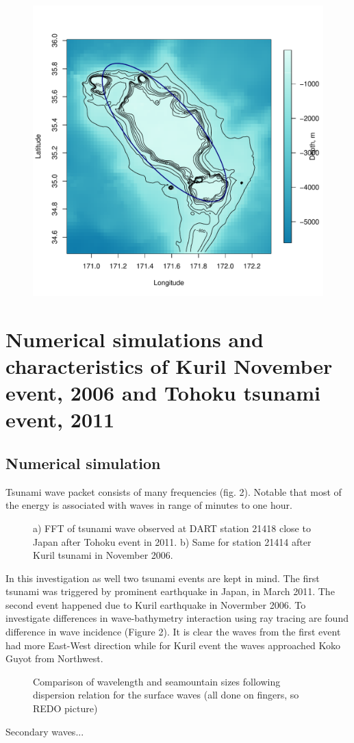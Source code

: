 \begin{figure}[h]
\centering
\includegraphics[scale=0.5]{../figures/koko_ell.pdf}
\end{figure}

\section{Numerical simulations and characteristics of Kuril November event, 2006 and Tohoku tsunami event, 2011}
\subsection{Numerical simulation}
Tsunami wave packet consists of many frequencies (fig. 2). Notable that most of the energy is associated with waves in range of minutes to one hour.
\begin{figure}
\caption{a) FFT of tsunami wave observed at DART station 21418 close to Japan after Tohoku event in 2011. b) Same for station 21414 after Kuril tsunami in November 2006.}
\end{figure}
In this investigation as well two tsunami events are kept in mind. The first tsunami was triggered by prominent earthquake in Japan, in March 2011. The second event happened due to Kuril earthquake in Novermber 2006. To investigate differences in wave-bathymetry interaction using ray tracing are found difference in wave incidence (Figure 2). It is clear the waves from the first event had more East-West direction while for Kuril event the waves approached Koko Guyot from Northwest.
\begin{figure}
\caption{Comparison of wavelength and seamountain sizes following dispersion relation for the surface waves (all done on fingers, so REDO picture)}
\end{figure}
Secondary waves...
